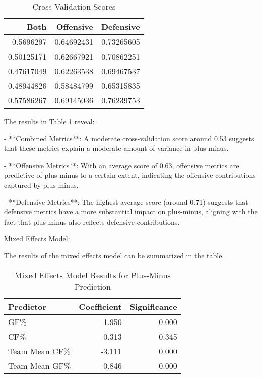 \documentclass[12pt]{article}
\begin{document}
\begin{table}[tbp]
  \caption{Cross Validation Scores}
  \label{tab:rv}
\centering
\begin{tabular}{rrr}
  \toprule
Both & Offensive & Defensive \\ 
  \midrule
  0.5696297 & 0.64692431 & 0.73265605 \\ 
  0.50125171 & 0.62667921 & 0.70862251 \\ 
  0.47617049 & 0.62263538 & 0.69467537 \\ 
  0.48944826 & 0.58484799 & 0.65315835 \\ 
  0.57586267 & 0.69145036 & 0.76239753 \\ 
  \bottomrule
\end{tabular}
\end{table}

The results in Table \ref{tab:rv} reveal:

- **Combined Metrics**: A moderate cross-validation score around 0.53 suggests that these metrics explain a moderate amount of variance 
in plus-minus.

- **Offensive Metrics**: With an average score of 0.63, offensive metrics are predictive of plus-minus to a certain extent, indicating 
the offensive contributions captured by plus-minus.

- **Defensive Metrics**: The highest average score (around 0.71) suggests that defensive metrics have a more substantial impact on 
plus-minus, aligning with the fact that plus-minus also reflects defensive contributions.

Mixed Effects Model:

The results of the mixed effects model can be summarized in the table.

\begin{table}[tbp]
  \caption{Mixed Effects Model Results for Plus-Minus Prediction}
  \label{tab:mixed-effects}
  \centering
  \begin{tabular}{lrr}
    \toprule
    Predictor & Coefficient & Significance \\ 
    \midrule
    GF\% & 1.950 & 0.000 \\
    CF\% & 0.313 & 0.345 \\ 
    Team Mean CF\% & -3.111 & 0.000 \\ 
    Team Mean GF\% & 0.846 & 0.000 \\ 
    \bottomrule
\end{tabular}
\end{table}
\end{document}
